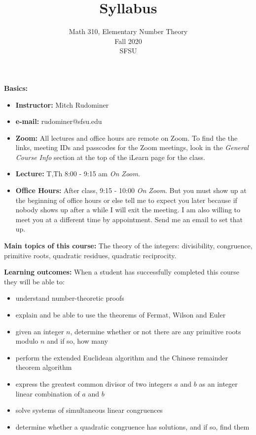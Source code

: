 \documentclass[oneside,12pt]{amsart}
\begin{document}
\title{Syllabus}
\author{Math 310, Elementary Number Theory  \\ Fall 2020 \\ SFSU }
\date{}

\maketitle

\textbf{Basics:}
\begin{itemize}
\item \textbf{Instructor:} Mitch Rudominer
\item \textbf{e-mail:} rudominer@sfsu.edu
\item \textbf{Zoom:} All lectures and office hours are remote on Zoom. To
find the the links, meeting IDs and passcodes for the Zoom meetings, look
in the \emph{General Course Info} section at the top of the iLearn
page for the class.
\item \textbf{Lecture:}  T,Th 8:00 - 9:15 am \emph{On Zoom}.
\item \textbf{Office Hours:} After class, 9:15 - 10:00 \emph{On Zoom}. But you must show
up at the beginning of office hours or else tell me to expect you later because if
nobody shows up after a while I will exit the meeting. I am also willing to meet
you at a different time by appointment. Send me an email to set that up.
\end{itemize}

\bigskip

\textbf{Main topics of this course:}
The theory of the integers: divisibility, congruence,
primitive roots, quadratic residues, quadratic reciprocity.

\bigskip

\textbf{Learning outcomes:}
When a student has successfully completed this course they will be able to:
\begin{itemize}
\item understand number-theoretic proofs
\item explain and be able to use the theorems of Fermat, Wilson and Euler
\item given an integer $n$, determine whether or not there are any primitive
roots modulo $n$ and if so, how many
\item perform the extended Euclidean algorithm and the Chinese remainder theorem algorithm
\item express the greatest common divisor of two integers $a$ and $b$ as an integer
linear combination of $a$ and $b$
\item solve systems of simultaneous linear congruences
\item determine  whether  a  quadratic congruence has solutions, and if so, find them
\end{itemize}
\end{document}
